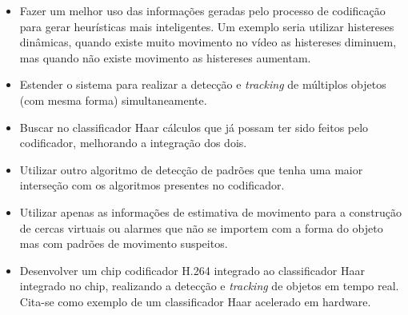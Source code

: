\documentclass[12pt]{article}
\begin{document}
\begin{itemize}
        \item Fazer um melhor uso das informações geradas pelo processo de codificação para gerar heurísticas mais inteligentes. Um exemplo seria utilizar histereses dinâmicas, quando existe muito movimento no vídeo as histereses diminuem, mas quando não existe movimento as histereses aumentam.
        \item Estender o sistema para realizar a detecção e \textit{tracking} de múltiplos objetos (com mesma forma) simultaneamente.
        \item Buscar no classificador Haar cálculos que já possam ter sido feitos pelo codificador, melhorando a integração dos dois.
        \item Utilizar outro algoritmo de detecção de padrões que tenha uma maior interseção com os algoritmos presentes no codificador.
        \item Utilizar apenas as informações de estimativa de movimento para a construção de cercas virtuais ou alarmes que não se importem com a forma do objeto mas com padrões de movimento suspeitos.
        \item Desenvolver um chip codificador H.264 integrado ao classificador Haar integrado no chip, realizando a detecção e \textit{tracking} de objetos em tempo real. Cita-se \cite{haarFPGA} como exemplo de um classificador Haar acelerado em hardware.
\end{itemize}



\end{document}
